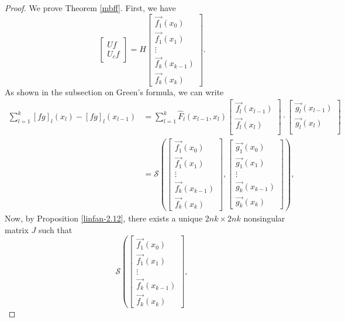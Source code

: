 \documentclass[11pt,reqno,oneside,a4paper]{article}
\theoremstyle{plain} %
\theoremstyle{definition}
\theoremstyle{remark}
\begin{document}
\begin{proof}
We prove Theorem \ref{mbff}. 
First, we have 
\[ 
\begin{bmatrix}
Uf \\
U_c f
\end{bmatrix} = 
H
\begin{bmatrix}
\vec{f_1}(x_{0})  \\
\vec{f_1}(x_1) \\
\vdots \\
\vec{f_k}(x_{k-1})  \\
\vec{f_k}(x_k)
\end{bmatrix}.
\]
As shown in the subsection on Green's formula, we can write 
\begin{align*}
\sum_{l=1}^{k} [fg]_l(x_l) - [fg]_l(x_{l-1}) &= \sum_{l=1}^{k} \widehat{F}_l(x_{l-1}, x_l) \begin{bmatrix}
\vec{f_l}(x_{l-1})  \\
\vec{f_l}(x_{l})  \\
\end{bmatrix}
\cdot
\begin{bmatrix}
\vec{g_l}(x_{l-1})  \\
\vec{g_l}(x_{l})  \\
\end{bmatrix}  \\
&= \mathcal{S} \left( \begin{bmatrix}
\vec{f_1}(x_{0})  \\
\vec{f_1}(x_1) \\
\vdots \\
\vec{f_k}(x_{k-1})  \\
\vec{f_k}(x_k)
\end{bmatrix},  
\begin{bmatrix}
\vec{g_1}(x_{0})  \\
\vec{g_1}(x_1) \\
\vdots \\
\vec{g_k}(x_{k-1})  \\
\vec{g_k}(x_k)
\end{bmatrix}
\right),
\end{align*}
Now, by Proposition \ref{linfan-2.12}, there exists a unique $2nk \times 2nk $ nonsingular matrix $J$ such that 
$$\mathcal{S} \left( \begin{bmatrix}
\vec{f_1}(x_{0})  \\
\vec{f_1}(x_1) \\
\vdots \\
\vec{f_k}(x_{k-1})  \\
\vec{f_k}(x_k)
\end{bmatrix},  
$$
\end{proof}
\end{document}
